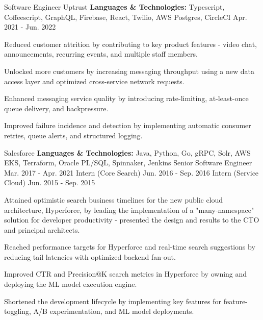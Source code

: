 
\begin{cventries}

  \cventry
    {Software Engineer}
    {Uptrust}
    {\textbf{Languages \& Technologies:} Typescript, Coffeescript, GraphQL, Firebase, React, Twilio, AWS Postgres, CircleCI}
    {Apr. 2021 - Jun. 2022}
    {
      \begin{cvitems}
        \item {Reduced customer attrition by contributing to key product features - video chat, announcements, recurring events, and multiple staff members.}
        \item {Unlocked more customers by increasing messaging throughput using a new data access layer and optimized cross-service network requests.}
        \item {Enhanced messaging service quality by introducing rate-limiting, at-least-once queue delivery, and backpressure.}
        \item {Improved failure incidence and detection by implementing automatic consumer retries, queue alerts, and structured logging.}
      \end{cvitems}
    }

  \cvthreeentry
    {Salesforce}
    {\textbf{Languages \& Technologies:} Java, Python, Go, gRPC, Solr, AWS EKS, Terraform, Oracle PL/SQL, Spinnaker, Jenkins}
    {Senior Software Engineer}
    {Mar. 2017 - Apr. 2021}
    {Intern (Core Search)}
    {Jun. 2016 - Sep. 2016}
    {Intern (Service Cloud)}
    {Jun. 2015 - Sep. 2015}
    {
      \begin{cvitems}
        \item {Attained optimistic search business timelines for the new public cloud architecture, Hyperforce, by leading the implementation of a "many-namespace" solution for developer productivity - presented the design and results to the CTO and principal architects.}
        \item {Reached performance targets for Hyperforce and real-time search suggestions by reducing tail latencies with optimized backend fan-out.}
        \item {Improved CTR and Precision@K search metrics in Hyperforce by owning and deploying the ML model execution engine.}
        \item {Shortened the development lifecycle by implementing key features for feature-toggling, A/B experimentation, and ML model deployments.}
      \end{cvitems}
    }


\end{cventries}
